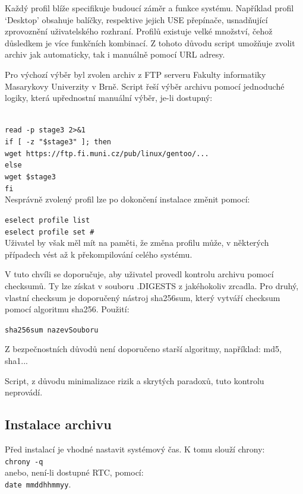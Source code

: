 \documentclass[12pt,a4paper,twoside,]{article}
\begin{document}
{{Každý profil blíže specifikuje budoucí záměr a funkce systému. Například profil
‘Desktop’ obsahuje balíčky, respektive jejich USE přepínače, usnadňující zprovoznění
uživatelského rozhraní.
Profilů existuje velké množství, čehož důsledkem je více funkčních kombinací. Z
tohoto důvodu script umožňuje zvolit archiv jak automaticky, tak i manuálně pomocí
URL adresy. 

Pro výchozí výběr byl zvolen archiv z FTP serveru Fakulty informatiky
Masarykovy Univerzity v Brně. Script řeší výběr archivu pomocí jednoduché logiky,
která upřednostní manuální výběr, je-li dostupný:}\\

\texttt{read -p stage3 2>\&1}\\
\texttt{if [ -z "\$stage3" ]; then}\\
\texttt{\hspace*{+1.5em}wget https://ftp.fi.muni.cz/pub/linux/gentoo/...\\}
\texttt{else}\\
\texttt{\hspace*{+1.5em}wget \$stage3}\\
\texttt{fi}\\

{Nesprávně zvolený profil lze po dokončení instalace změnit pomocí:\\}

\texttt{eselect profile list}\\
\texttt{\hspace*{--1.5em}eselect profile set \#}\\

{Uživatel by však měl mít na paměti, že změna profilu může, v některých případech
vést až k překompilování celého systému.}

V tuto chvíli se doporučuje, aby uživatel provedl kontrolu archivu pomocí checksumů.
Ty lze získat v souboru .DIGESTS z jakéhokoliv zrcadla. Pro druhý, vlastní checksum je doporučený nástroj sha256sum, který vytváří checksum pomocí algoritmu sha256. Použití:

\texttt{sha256sum nazevSouboru}

Z bezpečnostních důvodů není doporučeno starší algoritmy, například: md5, sha1...

Script, z důvodu minimalizace rizik a skrytých paradoxů, tuto kontrolu neprovádí.
\newpage
\subsection{\textsf{Instalace archivu}}
Před instalací je vhodné nastavit systémový čas. K tomu slouží chrony:\\
\texttt{chrony -q}\\
 anebo, není-li dostupné RTC, pomocí: \\ \texttt{date mmddhhmmyy}.\\
 
}
\end{document}
